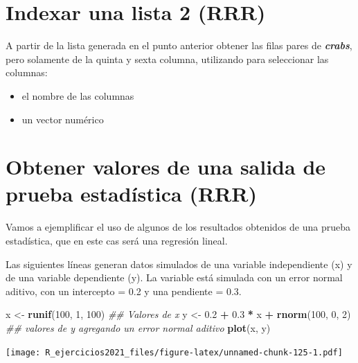 \documentclass[]{book}
\newenvironment{Shaded}{\begin{snugshade}}{\end{snugshade}}
\newcommand{\CommentTok}[1]{\textcolor[rgb]{0.56,0.35,0.01}{\textit{#1}}}
\newcommand{\DecValTok}[1]{\textcolor[rgb]{0.00,0.00,0.81}{#1}}
\newcommand{\FloatTok}[1]{\textcolor[rgb]{0.00,0.00,0.81}{#1}}
\newcommand{\KeywordTok}[1]{\textcolor[rgb]{0.13,0.29,0.53}{\textbf{#1}}}
\newcommand{\NormalTok}[1]{#1}
\newcommand{\OperatorTok}[1]{\textcolor[rgb]{0.81,0.36,0.00}{\textbf{#1}}}
\newcommand{\StringTok}[1]{\textcolor[rgb]{0.31,0.60,0.02}{#1}}
\providecommand{\tightlist}{%
  \setlength{\itemsep}{0pt}\setlength{\parskip}{0pt}}
\begin{document}
\hypertarget{indexar-una-lista-2-rrr}{%
\section{Indexar una lista 2 (RRR)}\label{indexar-una-lista-2-rrr}}

A partir de la lista generada en el punto anterior obtener las filas pares de \textbf{\emph{crabs}}, pero solamente de la quinta y sexta columna, utilizando para seleccionar las columnas:

\begin{itemize}
\tightlist
\item
  el nombre de las columnas
\item
  un vector numérico
\end{itemize}

\hypertarget{obtener-valores-de-una-salida-de-prueba-estaduxedstica-rrr}{%
\section{Obtener valores de una salida de prueba estadística (RRR)}\label{obtener-valores-de-una-salida-de-prueba-estaduxedstica-rrr}}

Vamos a ejemplificar el uso de algunos de los resultados obtenidos de una prueba estadística, que en este cas será una regresión lineal.

Las siguientes líneas generan datos simulados de una variable independiente (x) y de una variable dependiente (y). La variable está simulada con un error normal aditivo, con un intercepto = 0.2 y una pendiente = 0.3.

\begin{Shaded}
\begin{Highlighting}[]
\NormalTok{x <-}\StringTok{ }\KeywordTok{runif}\NormalTok{(}\DecValTok{100}\NormalTok{, }\DecValTok{1}\NormalTok{, }\DecValTok{100}\NormalTok{) }\CommentTok{## Valores de x}
\NormalTok{y <-}\StringTok{ }\FloatTok{0.2} \OperatorTok{+}\StringTok{ }\FloatTok{0.3} \OperatorTok{*}\StringTok{ }\NormalTok{x }\OperatorTok{+}\StringTok{ }\KeywordTok{rnorm}\NormalTok{(}\DecValTok{100}\NormalTok{, }\DecValTok{0}\NormalTok{, }\DecValTok{2}\NormalTok{) }\CommentTok{## valores de y agregando un error normal aditivo}
\KeywordTok{plot}\NormalTok{(x, y)}
\end{Highlighting}
\end{Shaded}

\texttt{[image: R\_ejercicios2021\_files/figure-latex/unnamed-chunk-125-1.pdf]}
\end{document}
